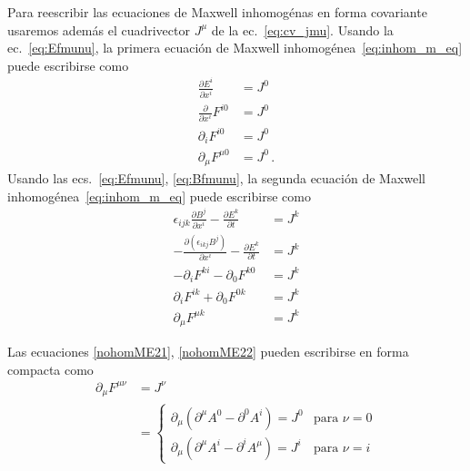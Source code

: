 Para reescribir las ecuaciones de Maxwell inhomog\'enas en forma
covariante usaremos adem\'as el cuadrivector $J^\mu$ de la
ec.~\eqref{eq:cv_jmu}.  Usando la ec.~\eqref{eq:Efmunu}, la primera
ecuaci\'on de Maxwell inhomog\'enea~\eqref{eq:inhom_m_eq} puede escribirse
como
\begin{align}
  \label{nohomME21}
    \frac{\partial E^{i}}{\partial x^{i}}&=J^0\nonumber\\
    \frac{\partial}{\partial x^{i}}F^{i0}&=J^0\nonumber\\
    \partial_iF^{i0}&=J^0\nonumber\\
    \partial_\mu F^{\mu0}&=J^0\,.
\end{align}
Usando las ecs.~\eqref{eq:Efmunu}, \eqref{eq:Bfmunu}, la segunda
ecuaci\'on de Maxwell inhomog\'enea~\eqref{eq:inhom_m_eq} puede escribirse
como
\begin{align}
  \epsilon_{ijk}\frac{\partial B^j}{\partial x^{i}}-\frac{\partial E^k}{\partial t}&=J^k\nonumber\\
  -\frac{\partial (\epsilon_{ikj}B^j)}{\partial x^{i}}-\frac{\partial E^k}{\partial t}&=J^k\nonumber\\
-\partial_iF^{ki}-\partial_0F^{k0}&=J^k\nonumber\\
\partial_iF^{ik}+\partial_0F^{0k}&=J^k\nonumber\\
\label{nohomME22}
\partial_\mu F^{\mu k}&=J^k
\end{align}

Las ecuaciones \eqref{nohomME21},
\eqref{nohomME22} pueden escribirse en forma compacta como
\begin{align}
\label{eq:nohomME2}
  \partial_\mu F^{\mu\nu}&=J^\nu\\
&=
\begin{cases}
  \partial_\mu(\partial^\mu A^0-\partial^0A^{i})=J^0&\text{para $\nu=0$}\\
  \partial_\mu(\partial^\mu A^{i}-\partial^{i}A^\mu)=J^{i}&\text{para $\nu=i$}
\end{cases}\nonumber
\end{align}


